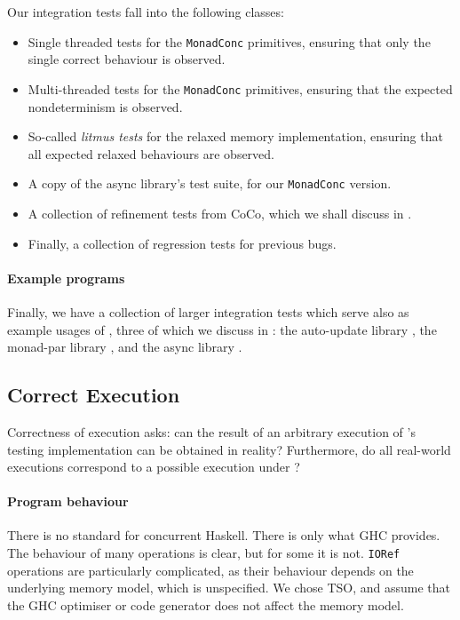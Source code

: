 Our integration tests fall into the following classes:

\begin{itemize}
\item Single threaded tests for the \verb|MonadConc| primitives,
  ensuring that only the single correct behaviour is observed.
\item Multi-threaded tests for the \verb|MonadConc| primitives,
  ensuring that the expected nondeterminism is observed.
\item So-called \emph{litmus tests} for the relaxed memory
  implementation, ensuring that all expected relaxed behaviours are
  observed.
\item A copy of the async library's \parencite{async} test suite, for our
  \verb|MonadConc| version.
\item A collection of refinement tests from CoCo, which we shall
  discuss in .
\item Finally, a collection of regression tests for previous bugs.
\end{itemize}

\paragraph{Example programs}
Finally, we have a collection of larger integration tests which serve
also as example usages of \dejafu{}, three of which we discuss in
: the auto-update
library \parencite{auto_update}, the monad-par
library \parencite{monad_par,marlow2011}, and the async library \parencite{async}.

\subsection{Correct Execution}

Correctness of execution asks: can the result of an arbitrary
execution of \dejafu{}'s testing implementation can be obtained in
reality?  Furthermore, do all real-world executions correspond to a
possible execution under \dejafu{}?

\paragraph{Program behaviour}
There is no standard for concurrent Haskell.  There is only what GHC
provides.  The behaviour of many operations is clear, but for some it
is not.  \verb|IORef| operations are particularly complicated, as their
behaviour depends on the underlying memory model, which is
unspecified.  We chose TSO, and assume that the GHC optimiser or code
generator does not affect the memory model.

